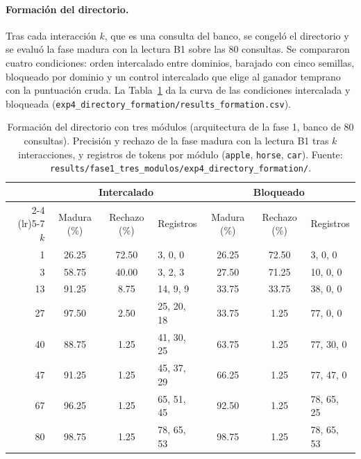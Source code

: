 \paragraph{Formación del directorio.}
Tras cada interacción $k$, que es una consulta del banco, se congeló el directorio y se
evaluó la fase madura con la lectura B1 sobre las 80 consultas.
Se compararon cuatro condiciones: orden intercalado entre dominios, barajado con cinco
semillas, bloqueado por dominio y un control intercalado que elige al ganador temprano
con la puntuación cruda.
La Tabla~\ref{tab:fase1-formacion} da la curva de las condiciones intercalada y
bloqueada (\texttt{exp4\_directory\_formation/results\_formation.csv}).

\begin{table}[H]
    \centering
    \caption[Formación del directorio con tres módulos]{Formación del directorio con
    tres módulos (arquitectura de la fase 1, banco de 80 consultas). Precisión y
    rechazo de la fase madura con la lectura B1 tras $k$ interacciones, y registros de
    tokens por módulo (\texttt{apple}, \texttt{horse}, \texttt{car}). Fuente:
    \texttt{results/fase1\_tres\_modulos/exp4\_directory\_formation/}.}
    \label{tab:fase1-formacion}
    \small
    \begin{tabular}{rcclccl}
        \toprule
        & \multicolumn{3}{c}{Intercalado} & \multicolumn{3}{c}{Bloqueado} \\
        \cmidrule(lr){2-4} \cmidrule(lr){5-7}
        $k$ & Madura (\%) & Rechazo (\%) & Registros & Madura (\%) & Rechazo (\%) & Registros \\
        \midrule
         1 & 26.25 & 72.50 & 3, 0, 0    & 26.25 & 72.50 & 3, 0, 0 \\
         3 & 58.75 & 40.00 & 3, 2, 3    & 27.50 & 71.25 & 10, 0, 0 \\
        13 & 91.25 &  8.75 & 14, 9, 9   & 33.75 & 33.75 & 38, 0, 0 \\
        27 & 97.50 &  2.50 & 25, 20, 18 & 33.75 &  1.25 & 77, 0, 0 \\
        40 & 88.75 &  1.25 & 41, 30, 25 & 63.75 &  1.25 & 77, 30, 0 \\
        47 & 91.25 &  1.25 & 45, 37, 29 & 66.25 &  1.25 & 77, 47, 0 \\
        67 & 96.25 &  1.25 & 65, 51, 45 & 92.50 &  1.25 & 78, 65, 25 \\
        80 & 98.75 &  1.25 & 78, 65, 53 & 98.75 &  1.25 & 78, 65, 53 \\
        \bottomrule
    \end{tabular}
\end{table}

